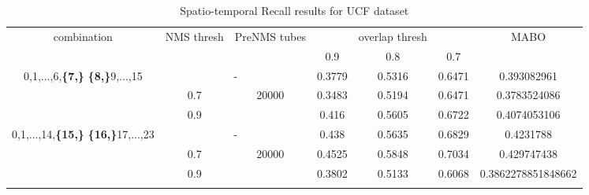 \documentclass{report}
\newcommand{\en}{\selectlanguage{english}}
\begin{document}
\begin{center}
  \en
  \setlength{\tabcolsep}{2pt}
\begin{longtable}{||c | c | c | c c c| c|}

  \hline
  \multirow{2}{*}{combination} & \multirow{2}{2.5em}{NMS thresh} & \multirow{2}{3.5em}{PreNMS tubes} &  {} &overlap thresh & {} & \multirow{2}{*}{MABO} \\
  {} & {} & {} &  0.9 &  0.8 & 0.7 & {}\\         
  \hline
  \multirow{3}{7em}{0,1,...,6,\textbf{\{7,\}}
  \textbf{\{8,\}}9,...,15 }   &   \multicolumn{2}{|c|}{-}     &  0.3779 & 0.5316 & 0.6471 & 0.393082961 \\
  \cline{2-7}
  {} & 0.7 &\multirow{2}{*}{20000}  & 0.3483  & 0.5194 & 0.6471 & 0.3783524086 \\
  \cline{2-2} \cline{4-7} 
  {} &  0.9   & {}   & 0.416 & 0.5605 & 0.6722 & 0.4074053106 \\
  \hline                                    
  \multirow{3}{7em}{0,1,...,14,\textbf{\{15,\}}
  \textbf{\{16,\}}17,...,23 }  &   \multicolumn{2}{|c|}{-} & 0.438 & 0.5635 & 0.6829 & 0.4231788 \\
  \cline{2-7}
  {} & 0.7 & \multirow{2}{*}{20000}   & 0.4525 & 0.5848 & 0.7034 & 0.429747438 \\
  \cline{2-2} \cline{4-7} 
  {} &  0.9   & {}   & 0.3802 & 0.5133 & 0.6068 & 0.3862278851848662 \\

  \hline                                    

  \caption{Spatio-temporal Recall results for UCF dataset}
  \label{table:ucf_nms_noup_recall}
\end{longtable} 
\end{center}
\end{document}
